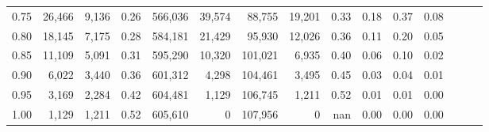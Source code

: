 \begin{tabular}{rrrrrrrrrrrrrrr}
0.75 &  26,466 &   9,136 &  0.26 &  566,036 &   39,574 &   88,755 &   19,201 &  0.33 &  0.18 &  0.37 &      0.08 \\
0.80 &  18,145 &   7,175 &  0.28 &  584,181 &   21,429 &   95,930 &   12,026 &  0.36 &  0.11 &  0.20 &      0.05 \\
0.85 &  11,109 &   5,091 &  0.31 &  595,290 &   10,320 &  101,021 &    6,935 &  0.40 &  0.06 &  0.10 &      0.02 \\
0.90 &   6,022 &   3,440 &  0.36 &  601,312 &    4,298 &  104,461 &    3,495 &  0.45 &  0.03 &  0.04 &      0.01 \\
0.95 &   3,169 &   2,284 &  0.42 &  604,481 &    1,129 &  106,745 &    1,211 &  0.52 &  0.01 &  0.01 &      0.00 \\
1.00 &   1,129 &   1,211 &  0.52 &  605,610 &        0 &  107,956 &        0 &   nan &  0.00 &  0.00 &      0.00 \\
\bottomrule
\end{tabular}
